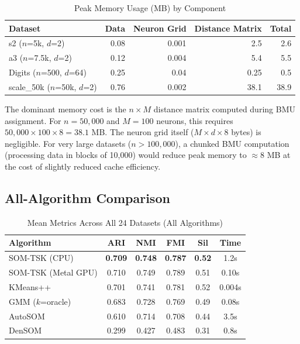 \documentclass[journal]{IEEEtran}
\begin{document}
\begin{table}[!t]
\caption{Peak Memory Usage (MB) by Component}
\label{tab:memory}
\centering
\renewcommand{\arraystretch}{1.1}
\small
\begin{tabular}{lrrrr}
\toprule
Dataset & Data & Neuron Grid & Distance Matrix & Total \\
\midrule
s2 ($n$=5k, $d$=2) & 0.08 & 0.001 & 2.5 & 2.6 \\
a3 ($n$=7.5k, $d$=2) & 0.12 & 0.004 & 5.4 & 5.5 \\
Digits ($n$=500, $d$=64) & 0.25 & 0.04 & 0.25 & 0.5 \\
scale\_50k ($n$=50k, $d$=2) & 0.76 & 0.002 & 38.1 & 38.9 \\
\bottomrule
\end{tabular}
\end{table}

The dominant memory cost is the $n \times M$ distance matrix computed during BMU assignment. For $n = 50{,}000$ and $M = 100$ neurons, this requires $50{,}000 \times 100 \times 8 = 38.1$ MB. The neuron grid itself ($M \times d \times 8$ bytes) is negligible. For very large datasets ($n > 100{,}000$), a chunked BMU computation (processing data in blocks of 10,000) would reduce peak memory to $\approx 8$ MB at the cost of slightly reduced cache efficiency.

\subsection{All-Algorithm Comparison}

\begin{table}[!t]
\caption{Mean Metrics Across All 24 Datasets (All Algorithms)}
\label{tab:all_algo}
\centering
\renewcommand{\arraystretch}{1.1}
\begin{tabular}{lccccc}
\toprule
Algorithm & ARI & NMI & FMI & Sil & Time \\
\midrule
SOM-TSK (CPU) & \textbf{0.709} & \textbf{0.748} & \textbf{0.787} & \textbf{0.52} & 1.2s \\
SOM-TSK (Metal GPU) & 0.710 & 0.749 & 0.789 & 0.51 & 0.10s \\
KMeans++ & 0.701 & 0.741 & 0.781 & 0.52 & 0.004s \\
GMM ($k$=oracle) & 0.683 & 0.728 & 0.769 & 0.49 & 0.08s \\
AutoSOM & 0.610 & 0.714 & 0.708 & 0.44 & 3.5s \\
DenSOM & 0.299 & 0.427 & 0.483 & 0.31 & 0.8s \\
\bottomrule
\end{tabular}
\end{table}
\end{document}
